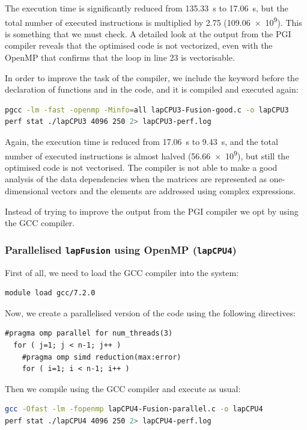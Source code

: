The execution time is significantly reduced from \SI{135.33}{\s} to \SI{17.06}{\s}, but the total number of executed instructions is multiplied by 2.75 (\num{109.06e9}). This is something that we must check. A detailed look at the output from the PGI compiler reveals that the optimised code is not vectorized, even with the OpenMP  that confirms that the loop in line 23 is vectorisable.

In order to improve the task of the compiler, we include the  keyword before the declaration of functions  and  in the  code, and it is compiled and executed again:
\begin{lstlisting}[language=bash]
pgcc -lm -fast -openmp -Minfo=all lapCPU3-Fusion-good.c -o lapCPU3
perf stat ./lapCPU3 4096 250 2> lapCPU3-perf.log
\end{lstlisting}

Again, the execution time is reduced from \SI{17.06}{\s} to \SI{9.43}{\s}, and the total number of executed instructions is almost halved (\num{56.66e9}), but still the optimised code is not vectorised. The compiler is not able to make a good analysis of the data dependencies when the matrices are represented as one-dimensional vectors and the elements are addressed using complex expressions.

Instead of trying to improve the output from the PGI compiler we opt by using the GCC compiler.

\subsubsection{Parallelised \texttt{lapFusion} using OpenMP (\texttt{lapCPU4})}
First of all, we need to load the GCC compiler into the system:
\begin{lstlisting}[language=bash]
module load gcc/7.2.0
\end{lstlisting}

Now, we create a parallelised version of the  code using the following  directives:
\begin{lstlisting}[firstnumber=24]
  #pragma omp parallel for num_threads(3)
  for ( j=1; j < n-1; j++ )
	#pragma omp simd reduction(max:error)
	for ( i=1; i < n-1; i++ )
\end{lstlisting}

Then we compile using the GCC compiler and execute as usual:
\begin{lstlisting}[language=bash]
gcc -Ofast -lm -fopenmp lapCPU4-Fusion-parallel.c -o lapCPU4
perf stat ./lapCPU4 4096 250 2> lapCPU4-perf.log
\end{lstlisting}

